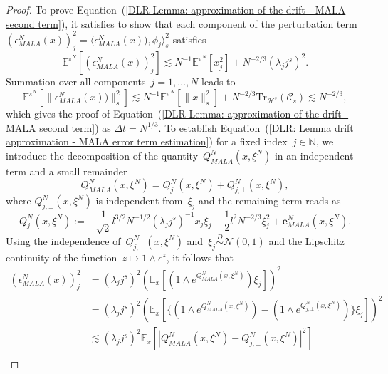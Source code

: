 \begin{proof}
 To prove Equation~(\ref{DLR-Lemma: approximation of the drift - MALA second term}), it satisfies to show that each component of the perturbation term~$ (\epsilon_{MALA}^N (x))_j^2 = \langle \epsilon_{MALA}^N (x)), \phi_j \rangle_s^2 $ satisfies
 \begin{equation}
   \label{DLR: Lemma drift approximation - MALA error term estimation}
   \mathbb{E}^{\pi^N}[(\epsilon_{MALA}^N (x))_j^2] \lesssim N^{-1} \mathbb{E}^{\pi^N}[ x_j^2 ] + N^{-2/3} (\lambda_j j^s)^2.
 \end{equation}
 Summation over all components~$j = 1, \dots, N$ leads to 
 \begin{equation*}
   \mathbb{E}^{\pi^N}[\|\epsilon_{MALA}^N (x))\|_s^2] \lesssim N^{-1} \mathbb{E}^{\pi^N}[ \|x\|_s^2 ] + N^{-2/3} \text{Tr}_{\mathcal{H}^s}(\mathcal{C}_s) \lesssim N^{-2/3},
 \end{equation*}
 which gives the proof of Equation~(\ref{DLR-Lemma: approximation of the drift - MALA second term}) as $\Delta t = N^{1/3}$. To establish Equation~(\ref{DLR: Lemma drift approximation - MALA error term estimation}) for a fixed index~$j \in \mathbb{N}$, we introduce the decomposition of the quantity~$Q^N_{MALA}(x, \xi^N)$ in an independent term and a small remainder
 \begin{equation}
   \label{DLR : Lemma Drift approximation - Decomposition Q MALA}
   Q^N_{MALA}(x, \xi^N) = Q^N_j (x, \xi^N) + Q^N_{j, \bot}(x, \xi^N),
 \end{equation}
 where $Q^N_{j, \bot}(x, \xi^N)$ is independent from~$\xi_j$ and the remaining term reads as
 \begin{equation}
   Q^N_j (x, \xi^N) := - \frac{1}{\sqrt{2}} l^{3/2} N^{-1/2} (\lambda_j j^s)^{-1} x_j \xi_j - \frac{1}{2} l^2 N^{-2/3} \xi_j^2 + \textbf{e}^N_{MALA}(x, \xi^N).
 \end{equation}
 Using the independence of~$Q^N_{j, \bot}(x, \xi^N)$ and~$\xi_j \stackrel{D}{\sim} \mathcal{N}(0,1)$ and the Lipschitz continuity of the function~$z \mapsto 1 \wedge e^{z}$, it follows that
 \begin{align*}
  (\epsilon_{MALA}^N (x))_j^2 & = (\lambda_j j^s)^2 \left( \mathbb{E}_x[ (1 \wedge e^{Q^N_{MALA}(x, \xi^N)})  \xi_j] \right)^2 \\
  & = (\lambda_j j^s)^2 \left( \mathbb{E}_x[ \{ (1 \wedge e^{Q^N_{MALA}(x, \xi^N)}) - (1 \wedge e^{Q^N_{j, \bot}(x, \xi^N)}) \} \xi_j] \right)^2 \\
  & \lesssim (\lambda_j j^s)^2  \mathbb{E}_x[|Q^N_{MALA} (x, \xi^N) - Q^N_{j, \bot}(x, \xi^N)|^2] \\

\end{align*}
\end{proof}
